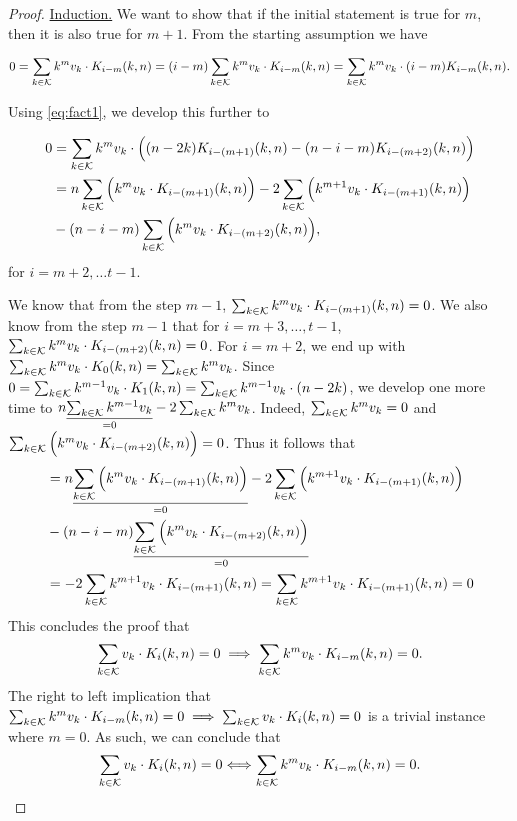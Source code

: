 \begin{proof}
    \underline{Induction.} We want to show that if the initial statement is true for $m$, then it is also true for $m+1$. From the starting assumption we have

    $$
    0 = \sum_{k \in \mathcal{K}} k^mv_k \cdot K_{i-m}(k, n) = (i-m)\sum_{k \in \mathcal{K}} k^mv_k \cdot K_{i-m}(k, n) = \sum_{k \in \mathcal{K}} k^mv_k \cdot (i-m)K_{i-m}(k, n).
    $$

    Using \cref{eq:fact1}, we develop this further to

    \begin{equation*}
    \begin{split}
        0 &= \sum_{k \in \mathcal{K}} k^mv_k \cdot \Big( (n - 2k)K_{i - (m+1)}(k, n) - (n - i - m)K_{i - (m + 2)}(k, n) \Big)\\
        & = n \sum_{k \in \mathcal{K}} \Big( k^mv_k \cdot K_{i - (m+1)}(k, n) \Big) - 2\sum_{k \in \mathcal{K}} \Big( k^{m+1}v_k \cdot K_{i - (m+1)}(k, n) \Big)\\& - (n - i - m)\sum_{k \in \mathcal{K}} \Big( k^mv_k \cdot K_{i - (m+2)}(k, n) \Big),
    \end{split}
    \end{equation*}
    for $i = m+2, \ldots t-1$.

    We know that from the step $m-1$, $\sum_{k \in \mathcal{K}} k^mv_k \cdot K_{i - (m+1)}(k, n) = 0$. We also know from the step $m-1$ that for $i = m+3, \ldots, t-1$, $\sum_{k \in \mathcal{K}} k^mv_k \cdot K_{i - (m+2)}(k, n) = 0$. For $i = m + 2$, we end up with $\sum_{k \in \mathcal{K}} k^mv_k \cdot K_0(k, n) = \sum_{k \in \mathcal{K}} k^mv_k$. Since $0 = \sum_{k \in \mathcal{K}} k^{m-1}v_k \cdot K_1(k, n) = \sum_{k \in \mathcal{K}} k^{m-1}v_k \cdot (n - 2k)$, we develop one more time to $n\underset{=0}{\underline{\sum_{k \in \mathcal{K}} k^{m-1}v_k}} - 2\sum_{k \in \mathcal{K}} k^mv_k$. Indeed, $\sum_{k \in \mathcal{K}} k^mv_k = 0$ and $\sum_{k \in \mathcal{K}} \Big( k^mv_k \cdot K_{i - (m+2)}(k, n) \Big) = 0$. Thus it follows that
    \begin{equation*}
    \begin{split}
        & = n \underset{=0}{\underline{\sum_{k \in \mathcal{K}} \Big( k^mv_k \cdot K_{i - (m+1)}(k, n) \Big)}} - 2\sum_{k \in \mathcal{K}} \Big( k^{m+1}v_k \cdot K_{i - (m+1)}(k, n) \Big)\\& - (n - i - m)\underset{=0}{\underline{\sum_{k \in \mathcal{K}} \Big( k^mv_k \cdot K_{i - (m+2)}(k, n) \Big)}}\\
        &= -2\sum_{k \in \mathcal{K}} k^{m+1}v_k \cdot K_{i - (m+1)}(k, n) = \sum_{k \in \mathcal{K}} k^{m+1}v_k \cdot K_{i - (m+1)}(k, n) = 0
    \end{split}
    \end{equation*}
    This concludes the proof that
    $$\sum_{k \in \mathcal{K}} v_k \cdot K_i(k, n) = 0 \implies \sum_{k \in \mathcal{K}} k^mv_k \cdot K_{i-m}(k, n) = 0.$$
    The right to left implication that $\sum_{k \in \mathcal{K}} k^mv_k \cdot K_{i-m}(k, n) = 0 \implies \sum_{k \in \mathcal{K}} v_k \cdot K_i(k, n) = 0$ is a trivial instance where $m = 0$. As such, we can conclude that
    $$\sum_{k \in \mathcal{K}} v_k \cdot K_i(k, n) = 0 \Longleftrightarrow \sum_{k \in \mathcal{K}} k^mv_k \cdot K_{i-m}(k, n) = 0.$$


\end{proof}
